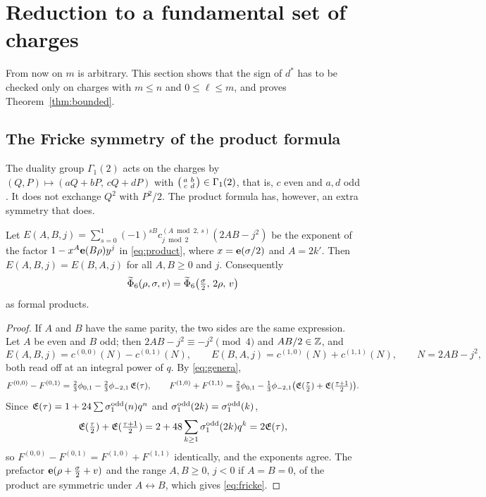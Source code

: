 \section{Reduction to a fundamental set of charges}\label{sec:reduction}

From now on $m$ is arbitrary. This section shows that the sign of $d^*$ has to be checked only on charges with $m\le n$ and $0\le\ell\le m$, and proves Theorem~\ref{thm:bounded}.

\subsection{The Fricke symmetry of the product formula}
The duality group $\Gamma_1(2)$ acts on the charges by $(Q,P)\mapsto(aQ+bP,\,cQ+dP)$ with $\begin{psmallmatrix}a&b\\c&d\end{psmallmatrix}\in\Gamma_1(2)$, that is, $c$ even and $a,d$ odd \cite[(5.17)--(5.19)]{BSS25}. It does not exchange $Q^2$ with $P^2/2$. The product formula has, however, an extra symmetry that does.

\begin{lemma}\label{lem:fricke}
Let $E(A,B,j)=\sum_{s=0}^1(-1)^{sB}c^{(A\bmod2,\,s)}_{j\bmod2}(2AB-j^2)$ be the exponent of the factor $1-x^A\mathbf e(B\rho)y^j$ in \eqref{eq:product}, where $x=\mathbf e(\sigma/2)$ and $A=2k'$. Then $E(A,B,j)=E(B,A,j)$ for all $A,B\ge0$ and $j$. Consequently
\begin{equation}\label{eq:fricke}
\widetilde\Phi_6(\rho,\sigma,v)=\widetilde\Phi_6\big(\tfrac\sigma2,\,2\rho,\,v\big)
\end{equation}
as formal products.
\end{lemma}

\begin{proof}
If $A$ and $B$ have the same parity, the two sides are the same expression. Let $A$ be even and $B$ odd; then $2AB-j^2\equiv-j^2\pmod4$ and $AB/2\in\mathbb{Z}$, and
\[
E(A,B,j)=c^{(0,0)}(N)-c^{(0,1)}(N),\qquad E(B,A,j)=c^{(1,0)}(N)+c^{(1,1)}(N),\qquad N=2AB-j^2,
\]
both read off at an integral power of $q$. By \eqref{eq:genera},
\[
F^{(0,0)}-F^{(0,1)}=\tfrac23\phi_{0,1}-\tfrac23\phi_{-2,1}\,\mathfrak E(\tau),\qquad F^{(1,0)}+F^{(1,1)}=\tfrac23\phi_{0,1}-\tfrac13\phi_{-2,1}\big(\mathfrak E(\tfrac\tau2)+\mathfrak E(\tfrac{\tau+1}2)\big).
\]
Since $\mathfrak E(\tau)=1+24\sum\sigma_1^{\rm odd}(n)q^n$ and $\sigma^{\rm odd}_1(2k)=\sigma^{\rm odd}_1(k)$,
\[
\mathfrak E(\tfrac\tau2)+\mathfrak E(\tfrac{\tau+1}2)=2+48\sum_{k\ge1}\sigma_1^{\rm odd}(2k)q^k=2\mathfrak E(\tau),
\]
so $F^{(0,0)}-F^{(0,1)}=F^{(1,0)}+F^{(1,1)}$ identically, and the exponents agree. The prefactor $\mathbf e(\rho+\frac\sigma2+v)$ and the range $A,B\ge0$, $j<0$ if $A=B=0$, of the product are symmetric under $A\leftrightarrow B$, which gives \eqref{eq:fricke}.
\end{proof}

